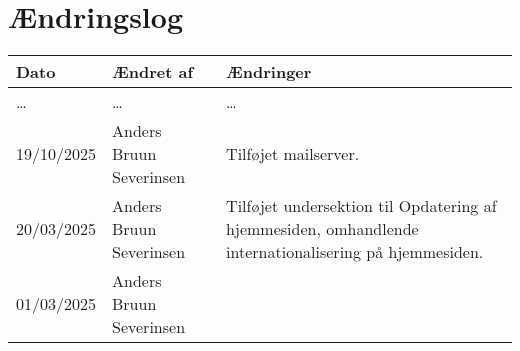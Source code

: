 \section{Ændringslog}
\label{sec:changelog}

\begin{tabular}{l l l}
    \textbf{Dato} & \textbf{Ændret af} & \textbf{Ændringer} \\
    \hline
    \begin{minipage}[t]
        {0.15\linewidth}
        \dots
    \end{minipage} &
    \begin{minipage}[t]
        {0.35\linewidth}
        \dots
    \end{minipage} & 
    \begin{minipage}[t]
        {0.5\linewidth}
        \dots
    \end{minipage} \\
    \hline
    \begin{minipage}[t]
        {0.15\linewidth}
        19/10/2025
    \end{minipage} &
    \begin{minipage}[t]
        {0.35\linewidth}
        Anders Bruun Severinsen
    \end{minipage} & 
    \begin{minipage}[t]
        {0.5\linewidth}
        Tilføjet mailserver.
    \end{minipage} \\
    \hline
    \begin{minipage}[t]
        {0.15\linewidth}
        20/03/2025
    \end{minipage} &
    \begin{minipage}[t]
        {0.35\linewidth}
        Anders Bruun Severinsen
    \end{minipage} & 
    \begin{minipage}[t]
        {0.5\linewidth}
        Tilføjet undersektion til Opdatering af hjemmesiden, omhandlende 
        internationalisering på hjemmesiden.
    \end{minipage} \\
    \hline
    \begin{minipage}[t]
        {0.15\linewidth}
        01/03/2025
    \end{minipage} &
    \begin{minipage}[t]
        {0.35\linewidth}
        Anders Bruun Severinsen
    \end{minipage} & 
    \begin{minipage}[t]

\end{minipage}
\end{tabular}
